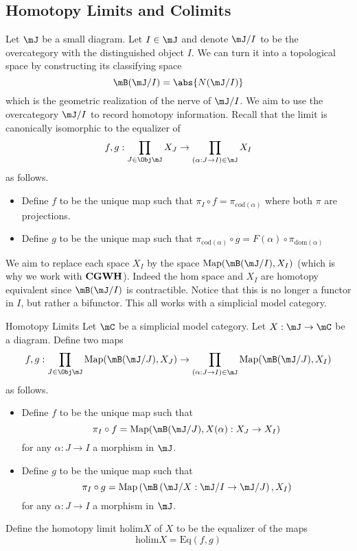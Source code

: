 \documentclass[a4paper]{article}
\begin{document}
\subsection{Homotopy Limits and Colimits}
Let $\mJ$ be a small diagram. Let $I\in\mJ$ and denote $\mJ/I$ to be the overcategory with the distinguished object $I$. We can turn it into a topological space by constructing its classifying space $$\mB(\mJ/I)=\abs{N(\mJ/I)}$$ which is the geometric realization of the nerve of $\mJ/I$. We aim to use the overcategory $\mJ/I$ to record homotopy information. Recall that the limit is canonically isomorphic to the equalizer of $$f,g:\prod_{J\in\Obj\mJ}X_J\to\prod_{(\alpha:J\to I)\in\mJ}X_I$$ as follows. 
\begin{itemize}
\item Define $f$ to be the unique map such that $\pi_I\circ f=\pi_{\text{cod}(\alpha)}$ where both $\pi$ are projections. 
\item Define $g$ to be the unique map such that $\pi_{\text{cod}(\alpha)}\circ g=F(\alpha)\circ\pi_{\text{dom}(\alpha)}$
\end{itemize}
We aim to replace each space $X_I$ by the space $\text{Map}(\mB(\mJ/I),X_I)$ (which is why we work with $\bold{CGWH}$). Indeed the hom space and $X_I$ are homotopy equivalent since $\mB(\mJ/I)$ is contractible. Notice that this is no longer a functor in $I$, but rather a bifunctor. This all works with a simplicial model category. 

\begin{defn}{Homotopy Limits}{} Let $\mC$ be a simplicial model category. Let $X:\mJ\to\mC$ be a diagram. Define two maps $$f,g:\prod_{J\in\Obj\mJ}\text{Map}(\mB(\mJ/J),X_J)\to\prod_{(\alpha:J\to I)\in\mJ}\text{Map}(\mB(\mJ/J),X_I)$$ as follows. 
\begin{itemize}
\item Define $f$ to be the unique map such that $$\pi_I\circ f=\text{Map}(\mB(\mJ/J),X(\alpha):X_J\to X_I)$$ for any $\alpha:J\to I$ a morphism in $\mJ$. 
\item Define $g$ to be the unique map such that $$\pi_I\circ g=\text{Map}\left(\mB\left(\mJ/X:\mJ/I\to\mJ/J\right),X_I\right)$$ for any $\alpha:J\to I$ a morphism in $\mJ$. 
\end{itemize}
Define the homotopy limit $\text{holim}X$ of $X$ to be the equalizer of the maps $$\text{holim}X=\text{Eq}(f,g)$$
\end{defn}
\end{document}
